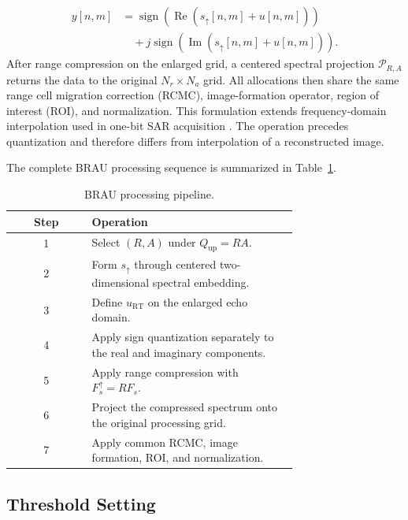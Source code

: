 \documentclass[conference]{IEEEtran}
\begin{document}
\begin{equation}
    \begin{aligned}
    y[n,m]&=\operatorname{sign}\!\left(\operatorname{Re}
    (s_{\uparrow}[n,m]+u[n,m])\right)\\
    &\quad+j\operatorname{sign}\!\left(\operatorname{Im}
    (s_{\uparrow}[n,m]+u[n,m])\right).
    \end{aligned}
\end{equation}
After range compression on the enlarged grid, a centered spectral projection $\mathcal{P}_{R,A}$ returns the data to the original $N_r\times N_a$ grid. All allocations then share the same range cell migration correction (RCMC), image-formation operator, region of interest (ROI), and normalization. This formulation extends frequency-domain interpolation used in one-bit SAR acquisition \cite{zhao2019onebit}. The operation precedes quantization and therefore differs from interpolation of a reconstructed image.

The complete BRAU processing sequence is summarized in Table~\ref{tab:brau_pipeline}.

\begin{table}[t]
\caption{BRAU processing pipeline.}
\label{tab:brau_pipeline}
\centering
\scriptsize
\setlength{\tabcolsep}{3pt}
\begin{tabular}{c p{0.72\linewidth}}
\hline
Step & Operation \\
\hline
1 & Select $(R,A)$ under $Q_{\mathrm{up}}=RA$. \\
2 & Form $s_{\uparrow}$ through centered two-dimensional spectral embedding. \\
3 & Define $u_{\mathrm{RT}}$ on the enlarged echo domain. \\
4 & Apply sign quantization separately to the real and imaginary components. \\
5 & Apply range compression with $F_s^{\uparrow}=RF_s$. \\
6 & Project the compressed spectrum onto the original processing grid. \\
7 & Apply common RCMC, image formation, ROI, and normalization. \\
\hline
\end{tabular}
\end{table}

\subsection{Threshold Setting}
\end{document}
